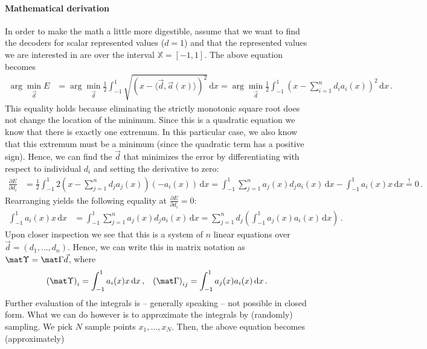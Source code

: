 \documentclass[10pt,letterpaper,oneside]{article}
\begin{document}
\paragraph{Mathematical derivation} In order to make the math a little more digestible, assume that we want to find the decoders for scalar represented values ($d = 1$) and that the represented values we are interested in are over the interval $\mathbb{X} = [-1, 1]$. The above equation becomes
\begin{align}
	\arg\min_{\vec d} E
		&= \arg\min_{\vec d} \frac{1}{2} \int_{-1}^1 \sqrt{ \left(x - \langle \vec d, \vec a(x) \rangle\right)^2 } \,\mathrm{d}x
		 = \arg\min_{\vec d} \frac{1}{2} \int_{-1}^1 \left(x - \sum_{i = 1}^n d_i a_i(x) \right)^2 \,\mathrm{d}x \,.
	\label{eqn:decoder_loss}
\end{align}
This equality holds because eliminating the strictly monotonic square root does not change the location of the minimum. Since this is a quadratic equation we know that there is exactly one extremum. In this particular case, we also know that this extremum must be a minimum (since the quadratic term has a positive sign). Hence, we can find the $\vec d$ that minimizes the error by differentiating with respect to individual $d_i$ and setting the derivative to zero:
\begin{align*}
	\frac{\partial E}{\partial d_i}
		&= \frac{1}2 \int_{-1}^1 2 \left(x - \sum_{j = 1}^n d_j a_j(x) \right) \left(-a_i(x) \right) \,\mathrm{d}x
		 = \int_{-1}^1 \sum_{j = 1}^n a_j(x) d_j a_i(x) \,\mathrm{d}x - \int_{-1}^1 a_i(x) x \,\mathrm{d}x
		\overset{!}= 0 \,.
\end{align*}
Rearranging yields the following equality at $\frac{\partial E}{\partial d_i} = 0$:
\begin{align*}
	\int_{-1}^1 a_i(x) x \,\mathrm{d}x
		&= \int_{-1}^1 \sum_{j = 1}^n a_j(x) d_j a_i(x) \,\mathrm{d}x
		 = \sum_{j = 1}^n d_j \left( \int_{-1}^1 a_j(x) a_i(x) \,\mathrm{d}x \right) \,.
\end{align*}
Upon closer inspection we see that this is a system of $n$ linear equations over $\vec d = (d_1, \ldots, d_n)$. Hence, we can write this in matrix notation as $\mat\Upsilon = \mat\Gamma \vec d$, where
\begin{align*}
	\left( \mat\Upsilon \right)_i
		&= \int_{-1}^1 a_i(x) x \,\mathrm{d}x \,, &
	\left( \mat\Gamma \right)_{ij}
		 = \int_{-1}^1 a_j(x) a_i(x) \,\mathrm{d}x \,.
\end{align*}
Further evaluation of the integrals is -- generally speaking -- not possible in closed form. What we can do however is to approximate the integrals by (randomly) sampling. We pick $N$ sample points $x_1, \ldots, x_N$. Then, the above equation becomes (approximately)
\end{document}
